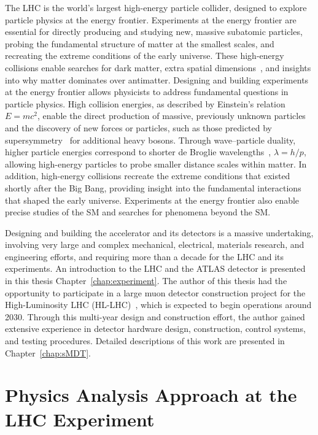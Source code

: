 The LHC is the world’s largest high-energy particle collider, designed to explore particle physics at the energy frontier. Experiments at the energy frontier are essential for directly producing and studying new, massive subatomic particles, probing the fundamental structure of matter at the smallest scales, and recreating the extreme conditions of the early universe. These high-energy collisions enable searches for dark matter, extra spatial dimensions~\cite{ArkaniHamed1998ADD1,ArkaniHamed1998ADD2,RandallSundrum1999RS1,RandallSundrum1999RS2}, and insights into why matter dominates over antimatter.
%
Designing and building experiments at the energy frontier allows physicists to address fundamental questions in particle physics. High collision energies, as described by Einstein’s relation $E=mc^2$, enable the direct production of massive, previously unknown particles and the discovery of new forces or particles, such as those predicted by supersymmetry~\cite{WessZumino1974,GolfandLikhtman1971,SalamStrathdee1974} for additional heavy bosons. Through wave--particle duality, higher particle energies correspond to shorter de Broglie wavelengths~\cite{deBroglie1924Letter}, $\lambda=h/p$, allowing high-energy particles to probe smaller distance scales within matter. In addition, high-energy collisions recreate the extreme conditions that existed shortly after the Big Bang, providing insight into the fundamental interactions that shaped the early universe. Experiments at the energy frontier also enable precise studies of the SM and searches for phenomena beyond the SM.

Designing and building the accelerator and its detectors is a massive undertaking, involving very large and complex mechanical, electrical, materials research, and engineering efforts, and requiring more than a decade for the LHC and its experiments. An introduction to the LHC and the ATLAS detector is presented in this thesis Chapter~\ref{chap:experiment}.
The author of this thesis had the opportunity to participate in a large muon detector construction project for the High-Luminosity LHC (HL-LHC)~\cite{Apollinari:2015bam}, which is expected to begin operations around 2030. Through this multi-year design and construction effort, the author gained extensive experience in detector hardware design, construction, control systems, and testing procedures. Detailed descriptions of this work are presented in Chapter~\ref{chap:sMDT}.

\section{Physics Analysis Approach at the LHC Experiment}

